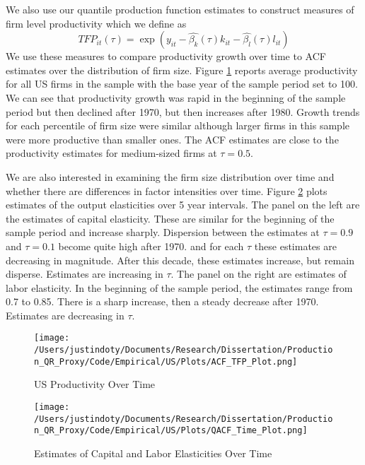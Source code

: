 \documentclass[11pt]{article}
\begin{document}
We also use our quantile production function estimates to construct measures of firm level productivity which we define as
\begin{equation}
TFP_{it}(\tau)=\exp(y_{it}-\hat{\beta_{k}}(\tau)k_{it}-\hat{\beta_{l}}(\tau)l_{it})
\end{equation}
We use these measures to compare productivity growth over time to ACF estimates over the distribution of firm size. Figure \ref{fig:ACFUSpgrowth} reports average productivity for all US firms in the sample with the base year of the sample period set to 100. We can see that productivity growth was rapid in the beginning of the sample period but then declined after 1970, but then increases after 1980. Growth trends for each percentile of firm size were similar although larger firms in this sample were more productive than smaller ones. The ACF estimates are close to the productivity estimates for medium-sized firms at $\tau=0.5$.

We are also interested in examining the firm size distribution over time and whether there are differences in factor intensities over time. Figure \ref{fig:ACFUStimecoef} plots estimates of the output elasticities over 5 year intervals. The panel on the left are the estimates of capital elasticity. These are similar for the beginning of the sample period and increase sharply. Dispersion between the estimates at $\tau=0.9$ and $\tau=0.1$ become quite high after 1970. and for each $\tau$ these estimates are decreasing in magnitude. After this decade, these estimates increase, but remain disperse. Estimates are increasing in $\tau$. The panel on the right are estimates of labor elasticity. In the beginning of the sample period, the estimates range from 0.7 to 0.85. There is a sharp increase, then a steady decrease after 1970. Estimates are decreasing in $\tau$.

\begin{figure}[H]
\centering
\caption{US Productivity Over Time}
\texttt{[image: /Users/justindoty/Documents/Research/Dissertation/Production\_QR\_Proxy/Code/Empirical/US/Plots/ACF\_TFP\_Plot.png]}
\label{fig:ACFUSpgrowth}
\end{figure}

\begin{figure}[H]
\centering
\caption{Estimates of Capital and Labor Elasticities Over Time}
\texttt{[image: /Users/justindoty/Documents/Research/Dissertation/Production\_QR\_Proxy/Code/Empirical/US/Plots/QACF\_Time\_Plot.png]}
\label{fig:ACFUStimecoef}
\end{figure}
\end{document}
